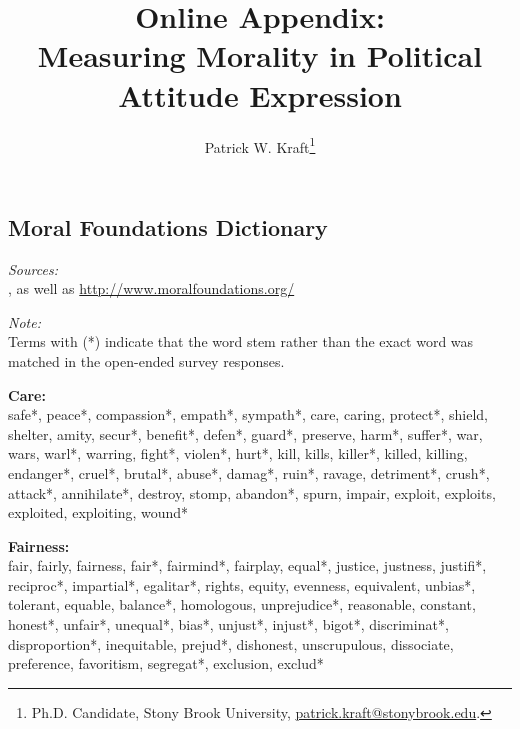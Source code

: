\documentclass[12pt]{article}
\title{{\large Online Appendix:}\\Measuring Morality in Political Attitude Expression}
\author{Patrick W. Kraft\footnote{Ph.D. Candidate, Stony Brook University, \href{mailto:patrick.kraft@stonybrook.edu}{patrick.kraft@stonybrook.edu}.}}
\date{}
\begin{document}
\renewcommand\thesubsection{\Roman{subsection}}

\maketitle
\appendices

\thispagestyle{empty}
\startcontents[sections]
\clearpage \setcounter{page}{1}

\begin{flushleft}\footnotesize
\section{Moral Foundations Dictionary}\label{app:dict}
\textit{Sources:}\\
\citet{graham2009liberals}, as well as \url{http://www.moralfoundations.org/}
\vspace{.5cm}

\textit{Note:}\\
Terms with (*) indicate that the word stem rather than the exact word was matched in the open-ended survey responses.
\vspace{.5cm}

\textbf{Care:}\\
safe*, peace*, compassion*, empath*, sympath*, care, caring, protect*, shield, shelter, amity, secur*, benefit*, defen*, guard*, preserve, harm*, suffer*, war, wars, warl*, warring, fight*, violen*, hurt*, kill, kills, killer*, killed, killing, endanger*, cruel*, brutal*, abuse*, damag*, ruin*, ravage, detriment*, crush*, attack*, annihilate*, destroy, stomp, abandon*, spurn, impair, exploit, exploits, exploited, exploiting, wound*
\vspace{.5cm}

\textbf{Fairness:}\\
fair, fairly, fairness, fair*, fairmind*, fairplay, equal*, justice, justness, justifi*, reciproc*, impartial*, egalitar*, rights, equity, evenness, equivalent, unbias*, tolerant, equable, balance*, homologous, unprejudice*, reasonable, constant, honest*, unfair*, unequal*, bias*, unjust*, injust*, bigot*, discriminat*, disproportion*, inequitable, prejud*, dishonest, unscrupulous, dissociate, preference, favoritism, segregat*, exclusion, exclud*
\vspace{.5cm}


\end{flushleft}
\end{document}
